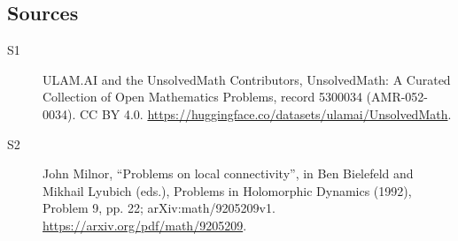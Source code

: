 \documentclass[11pt]{article}
\begin{document}
\subsection{Sources}
\begin{description}
\item[\hypertarget{source:5300034:1}{S1}] ULAM.AI and the UnsolvedMath Contributors, UnsolvedMath: A Curated Collection of Open Mathematics Problems, record 5300034 (AMR-052-0034). CC BY 4.0. \url{https://huggingface.co/datasets/ulamai/UnsolvedMath}.
\item[\hypertarget{source:5300034:2}{S2}] John Milnor, ``Problems on local connectivity'', in Ben Bielefeld and Mikhail Lyubich (eds.), Problems in Holomorphic Dynamics (1992), Problem 9, pp. 22; arXiv:math/9205209v1. \url{https://arxiv.org/pdf/math/9205209}.
\end{description}
\label{end:5300034}
\end{document}
